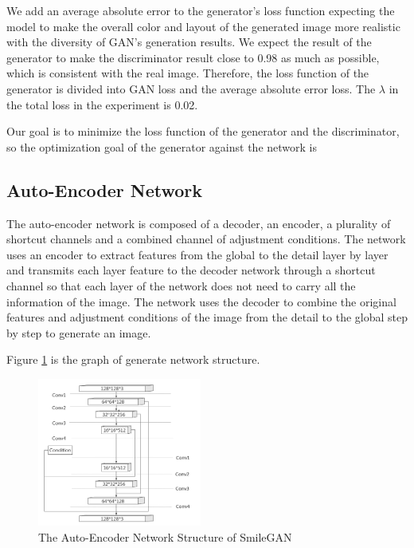 We add an average absolute error to the generator's loss function expecting the model to make the overall color and layout of the generated image more realistic with the diversity of GAN's generation results.
We expect the result of the generator to make the discriminator result close to 0.98 as much as possible, which is consistent with the real image.
Therefore, the loss function of the generator is divided into GAN loss and the average absolute error loss.
The $\lambda$ in the total loss in the experiment is 0.02.

Our goal is to minimize the loss function of the generator and the discriminator, so the optimization goal of the generator against the network is %



\subsection{Auto-Encoder Network}
The auto-encoder network is composed of a decoder, an encoder, a plurality of shortcut channels and a combined channel of adjustment conditions.
The network uses an encoder to extract features from the global to the detail layer by layer and transmits each layer feature to the decoder network through a shortcut channel so that each layer of the network does not need to carry all the information of the image.
The network uses the decoder to combine the original features and adjustment conditions of the image from the detail to the global step by step to generate an image.

Figure \ref{net_auto-encoder} is the graph of generate network structure.

\begin{figure}
    \begin{center}
    \includegraphics[width=0.48\textwidth]{figures/net_auto-encoder.png}
    \caption{The Auto-Encoder Network Structure of SmileGAN}
    \label{net_auto-encoder}
    \end{center}
\end{figure}

